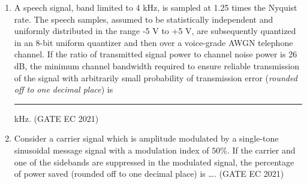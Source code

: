 \begin{enumerate}[label=\thechapter.\arabic*,ref=\thechapter.\theenumi]
\item A speech signal, band limited to 4 kHz, is sampled at 1.25 times the Nyquist rate. The speech samples, assumed to be statistically independent and uniformly distributed in the range -5 V to +5 V, are subsequently quantized in an 8-bit uniform quantizer and then over a voice-grade AWGN telephone channel. If the ratio of transmitted signal power to channel noise power is 26 dB, the minimum channel bandwidth required to ensure reliable transmission of the signal with arbitrarily small probability of transmission error (\textit{rounded off to one decimal place}) is \rule{1cm}{0.15mm} kHz.
\hfill (GATE EC 2021)
\solution

\pagebreak

\item Consider a carrier signal which is amplitude modulated by a single-tone sinusoidal message signal with a modulation index of $50\%$. If the carrier and one of the sidebands are suppressed in the modulated signal, the percentage of power saved (rounded off to one decimal place) is \ldots.
\hfill(GATE EC 2021)

\solution

\pagebreak
\end{enumerate}
